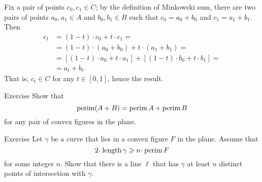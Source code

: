 Fix a pair of points $c_0,c_1\in C$;
by the definition of Minkowski sum, there are two pairs of points $a_0,a_1\in A$ and $b_0,b_1\in B$ such that $c_0=a_0+b_0$ and $c_1=a_1+b_1$.
Then 
\begin{align*}
c_t&=(1-t)\cdot c_0+t\cdot c_1=
\\
&=(1-t)\cdot (a_0+b_0)+t\cdot(a_1+b_1)=
\\
&=[(1-t)\cdot a_0+t\cdot a_1]+[(1-t)\cdot b_0+t\cdot b_1]=
\\
&=a_t+b_t.
\end{align*}
That is, $c_t\in C$ for any $t\in [0,1]$, hence the result.

\begin{thm}{Exercise}
Show that 
\[\mathop{\rm perim}\nolimits(A+B)=\mathop{\rm perim}\nolimits A+\mathop{\rm perim}\nolimits B\]
for any pair of convex figures in the plane.
\end{thm}

\begin{thm}{Exercise}
Let $\gamma$ be a curve that lies in a convex figure $F$ in the plane.
Assume that
\[2\cdot \length \gamma\ge n\cdot \perim F\]
for some integer $n$.
Show that there is a line $\ell$ that has $\gamma$  at least $n$ distinct points of intersection with $\gamma$.
\end{thm}


